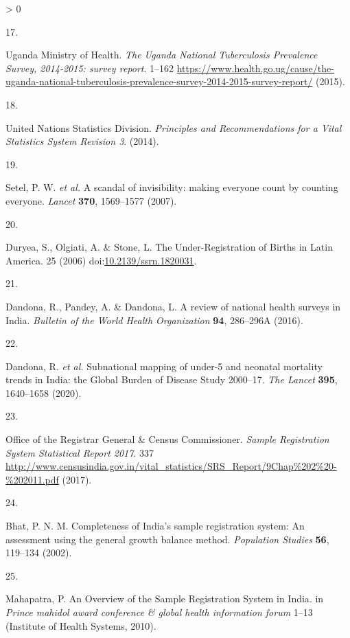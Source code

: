\documentclass[
]{article}
\newlength{\cslhangindent}
\newlength{\csllabelwidth}
\newenvironment{CSLReferences}[2] %
 {%
  \setlength{\parindent}{0pt}
  \ifodd #1 \everypar{\setlength{\hangindent}{\cslhangindent}}\ignorespaces\fi
  \ifnum #2 > 0
  \setlength{\parskip}{#2\baselineskip}
  \fi
 }%
 {}
\newcommand{\CSLLeftMargin}[1]{\parbox[t]{\csllabelwidth}{#1}}
\newcommand{\CSLRightInline}[1]{\parbox[t]{\linewidth - \csllabelwidth}{#1}\break}
\begin{document}
\begin{CSLReferences}{0}{0}
\leavevmode\hypertarget{ref-UgandaMinistryofHealth2015}{}%
\CSLLeftMargin{17. }
\CSLRightInline{Uganda Ministry of Health. \emph{{The Uganda National Tuberculosis Prevalence Survey, 2014-2015: survey report}}. 1--162 \url{https://www.health.go.ug/cause/the-uganda-national-tuberculosis-prevalence-survey-2014-2015-survey-report/} (2015).}

\leavevmode\hypertarget{ref-UnitedNationsStatisticsDivision2014}{}%
\CSLLeftMargin{18. }
\CSLRightInline{United Nations Statistics Division. \emph{{Principles and Recommendations for a Vital Statistics System Revision 3}}. (2014).}

\leavevmode\hypertarget{ref-Setel2007}{}%
\CSLLeftMargin{19. }
\CSLRightInline{Setel, P. W. \emph{et al.} {A scandal of invisibility: making everyone count by counting everyone}. \emph{Lancet} \textbf{370}, 1569--1577 (2007).}

\leavevmode\hypertarget{ref-Duryea2006}{}%
\CSLLeftMargin{20. }
\CSLRightInline{Duryea, S., Olgiati, A. \& Stone, L. {The Under-Registration of Births in Latin America}. 25 (2006) doi:\href{https://doi.org/10.2139/ssrn.1820031}{10.2139/ssrn.1820031}.}

\leavevmode\hypertarget{ref-Dandona2016}{}%
\CSLLeftMargin{21. }
\CSLRightInline{Dandona, R., Pandey, A. \& Dandona, L. {A review of national health surveys in India}. \emph{Bulletin of the World Health Organization} \textbf{94}, 286--296A (2016).}

\leavevmode\hypertarget{ref-Dandona2020}{}%
\CSLLeftMargin{22. }
\CSLRightInline{Dandona, R. \emph{et al.} {Subnational mapping of under-5 and neonatal mortality trends in India: the Global Burden of Disease Study 2000--17}. \emph{The Lancet} \textbf{395}, 1640--1658 (2020).}

\leavevmode\hypertarget{ref-CensusofIndia2017}{}%
\CSLLeftMargin{23. }
\CSLRightInline{Office of the Registrar General \& Census Commissioner. \emph{{Sample Registration System Statistical Report 2017}}. 337 \url{http://www.censusindia.gov.in/vital_statistics/SRS_Report/9Chap\%202\%20-\%202011.pdf} (2017).}

\leavevmode\hypertarget{ref-Bhat2002}{}%
\CSLLeftMargin{24. }
\CSLRightInline{Bhat, P. N. M. {Completeness of India's sample registration system: An assessment using the general growth balance method}. \emph{Population Studies} \textbf{56}, 119--134 (2002).}

\leavevmode\hypertarget{ref-Mahapatra2010}{}%
\CSLLeftMargin{25. }
\CSLRightInline{Mahapatra, P. {An Overview of the Sample Registration System in India}. in \emph{Prince mahidol award conference \& global health information forum} 1--13 (Institute of Health Systems, 2010).}


\end{CSLReferences}
\end{document}
